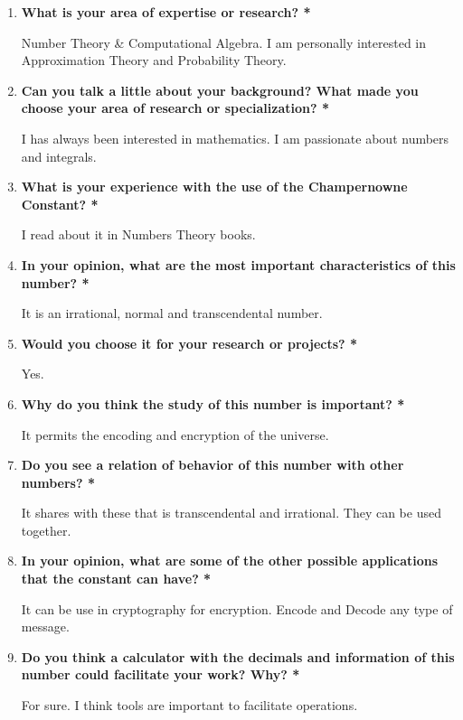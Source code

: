 \documentclass{report}
\begin{document}
\begin{enumerate}
\item\textbf{What is your area of expertise or research?\color{red} *}

Number Theory \& Computational Algebra. I am personally interested in Approximation Theory and Probability Theory.

\item\textbf{Can you talk a little about your background? What made you choose your area of research or specialization?\color{red} *}

I has always been interested in mathematics. I am passionate about numbers and integrals.

\item\textbf{What is your experience with the use of the Champernowne Constant? \color{red} *}

I read about it in Numbers Theory books. 

\item\textbf{In your opinion, what are the most important characteristics of this number? \color{red} *}

It is an irrational, normal and transcendental number.

\item\textbf{Would you choose it for your research or projects?\color{red} *}

Yes.

\item\textbf{Why do you think the study of this number is important?\color{red} *}

It permits the encoding and encryption of the universe.

\item\textbf{Do you see a relation of behavior of this number with other numbers?\color{red} *}

It shares with these that is transcendental and irrational. They can be used together.

\item\textbf{In your opinion, what are some of the other possible applications that the constant can have?\color{red} *}

It can be use in cryptography for encryption. Encode and Decode any type of message.

\item\textbf{Do you think a calculator with the decimals and information of this number could facilitate your work? Why?\color{red} *}

For sure. I think tools are important to facilitate operations.


\end{enumerate}
\end{document}
